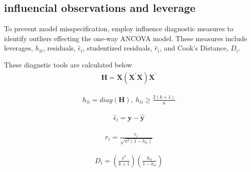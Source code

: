 \documentclass[10pt, twoside, openleft]{article}
\newcommand{\epsilonhat}{\hat{\epsilon}} %
\newcommand{\yhat}{\hat{y}} %
\newcommand{\rhat}{\hat{r}} %
\begin{document}
\begin{center}
\subsection{influencial observations and leverage}
\vspace{-3ex}
\end{center}

\noindent
To prevent model misspecification, employ influence diagnostic measures
to identify outliers effecting the one-way ANCOVA model. These measures include
leverages, $h_{ii}$, residuals, $\epsilonhat_{i}$, studentized residuals,
$\hat{r}_{i}$, and Cook's Distance, $D_{i}$.
\smallskip

These diagnstic tools are calculated below
\begin{equation*}
\begin{aligned}
\mathbf{H} = \mathbf{X} ( \mathbf{X}^{'} \mathbf{X} ) \mathbf{X}^{'}
\end{aligned}
\end{equation*}

\begin{equation*}
\begin{aligned}
h_{ii} = diag(\mathbf{H}), \ h_{ii} \geq \frac{ 2 ( k+1 ) }{ n }
\end{aligned}
\end{equation*}

\begin{equation*}
\begin{aligned}
\epsilonhat_{i} = \mathbf{y} - \mathbf{\yhat}
\end{aligned}
\end{equation*}

\begin{equation*}
\begin{aligned}
\rhat_{i} = \frac{ \epsilonhat_{i} }{ \sqrt{ \sigma^{2} ( 1 - h_{ii} ) } }
\end{aligned}
\end{equation*}

\begin{equation*}
\begin{aligned}
D_{i} = \left( \frac{ \rhat^{2} }{ k+1 } \right) \left( \frac{ h_{ii} }{ 1 - h_{ii} } \right)
\end{aligned}
\end{equation*}
\smallskip
\end{document}

